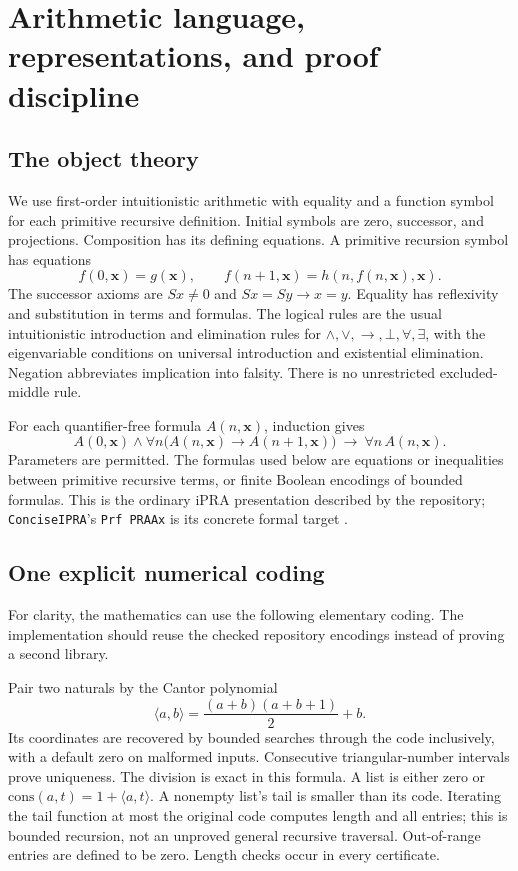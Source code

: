 \section{Arithmetic language, representations, and proof discipline}\label{sec:arithmetic}

\subsection{The object theory}

We use first-order intuitionistic arithmetic with equality and a function symbol for each primitive recursive definition. Initial symbols are zero, successor, and projections. Composition has its defining equations. A primitive recursion symbol has equations
\[
 f(0,\mathbf x)=g(\mathbf x),\qquad
 f(n+1,\mathbf x)=h(n,f(n,\mathbf x),\mathbf x).
\]
The successor axioms are \(Sx\ne0\) and \(Sx=Sy\to x=y\). Equality has reflexivity and substitution in terms and formulas. The logical rules are the usual intuitionistic introduction and elimination rules for \(\wedge,\vee,\to,\bot,\forall,\exists\), with the eigenvariable conditions on universal introduction and existential elimination. Negation abbreviates implication into falsity. There is no unrestricted excluded-middle rule.

For each quantifier-free formula \(A(n,\mathbf x)\), induction gives
\begin{equation}\label{eq:qfind}
 A(0,\mathbf x)\wedge
 \forall n\bigl(A(n,\mathbf x)\to A(n+1,\mathbf x)\bigr)
 \ \longrightarrow\ \forall n\,A(n,\mathbf x).
\end{equation}
Parameters are permitted. The formulas used below are equations or inequalities between primitive recursive terms, or finite Boolean encodings of bounded formulas. This is the ordinary iPRA presentation described by the repository; \texttt{ConciseIPRA}'s \texttt{Prf PRAAx} is its concrete formal target \cite{repo-readme,repo-concise}.

\subsection{One explicit numerical coding}

For clarity, the mathematics can use the following elementary coding. The implementation should reuse the checked repository encodings instead of proving a second library.

Pair two naturals by the Cantor polynomial
\[
 \langle a,b\rangle=\frac{(a+b)(a+b+1)}2+b.
\]
Its coordinates are recovered by bounded searches through the code inclusively, with a default zero on malformed inputs. Consecutive triangular-number intervals prove uniqueness. The division is exact in this formula. A list is either zero or
\(\mathrm{cons}(a,t)=1+\langle a,t\rangle\). A nonempty list's tail is smaller than its code. Iterating the tail function at most the original code computes length and all entries; this is bounded recursion, not an unproved general recursive traversal. Out-of-range entries are defined to be zero. Length checks occur in every certificate.

